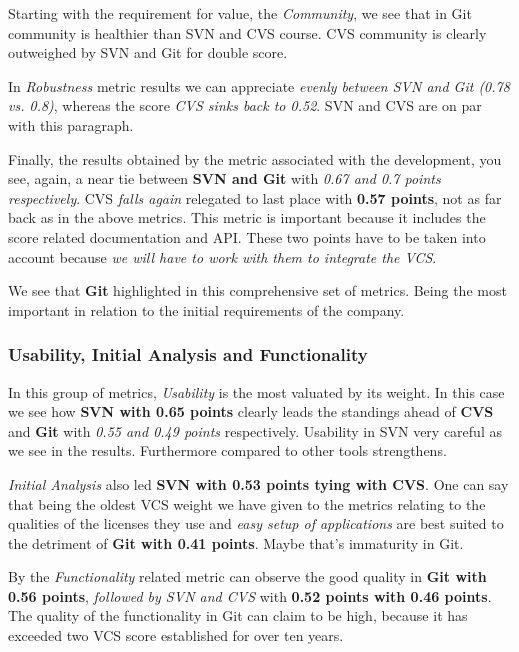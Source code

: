\documentclass[11pt]{scrartcl}
\begin{document}
\par Starting with the requirement for value, the \emph{Community}, we see that in Git community is healthier than SVN and CVS course. CVS community is clearly outweighed by SVN and Git for double score.

\par In \emph{Robustness} metric results we ​​can appreciate \emph{evenly between SVN and Git (0.78 vs. 0.8)}, whereas the score \emph{CVS sinks back to 0.52}. SVN and CVS are on par with this paragraph.

\par Finally, the results obtained by the metric associated with the development, you see, again, a near tie between \textbf{SVN and Git} with \emph{0.67 and 0.7 points respectively}. CVS \emph{falls again} relegated to last place with \textbf{0.57 points}, not as far back as in the above metrics. This metric is important because it includes the score related documentation and API. These two points have to be taken into account because \emph{we will have to work with them to integrate the VCS}.

\par We see that \textbf{Git} highlighted in this comprehensive set of metrics. Being the most important in relation to the initial requirements of the company.

\subsubsection{Usability, Initial Analysis and Functionality}

\par In this group of metrics, \emph{Usability} is the most valuated by its weight. In this case we see how \textbf{SVN with 0.65 points} clearly leads the standings ahead of \textbf{CVS} and \textbf{Git} with \emph{0.55 and 0.49 points} respectively. Usability in SVN very careful as we see in the results. Furthermore compared to other tools strengthens.

\par \emph{Initial Analysis} also led \textbf{SVN with 0.53 points tying with CVS}. One can say that being the oldest VCS weight we have given to the metrics relating to the qualities of the licenses they use and \emph{easy setup of applications} are best suited to the detriment of \textbf{Git with 0.41 points}. Maybe that's immaturity in Git.

\par By the \emph{Functionality} related metric can observe the good quality in \textbf{Git with 0.56 points}, \emph{followed by SVN and CVS} with \textbf{0.52 points with 0.46 points}. The quality of the functionality in Git can claim to be high, because it has exceeded two VCS score established for over ten years.
\end{document}

